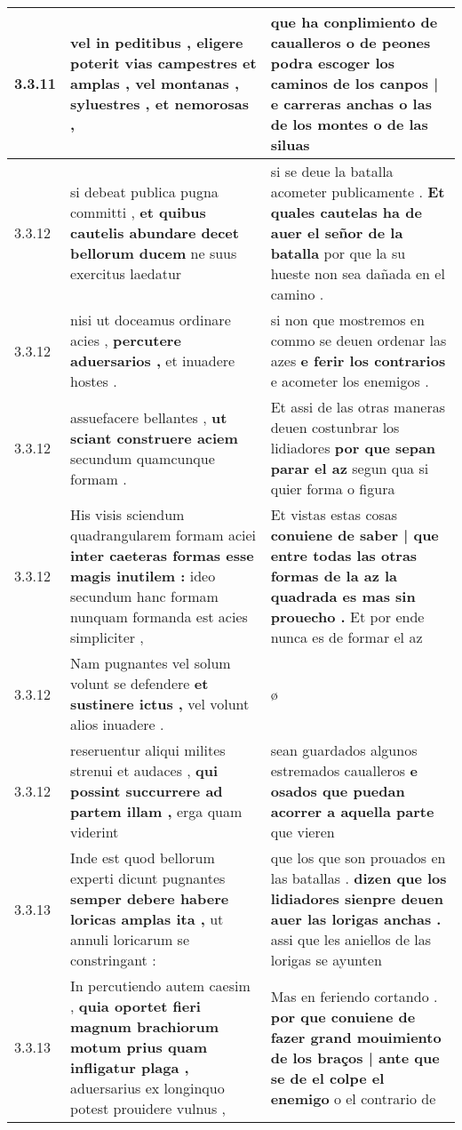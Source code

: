 \begin{tabular}{|p{1cm}|p{6.5cm}|p{6.5cm}|}
3.3.11 & vel in peditibus , \textbf{ eligere poterit vias campestres et amplas , } vel montanas , syluestres , et nemorosas , & que ha conplimiento de caualleros o de peones \textbf{ podra escoger los caminos de los canpos | e carreras anchas o las de los montes } o de las siluas \\\hline
3.3.12 & si debeat publica pugna committi , \textbf{ et quibus cautelis abundare decet bellorum ducem } ne suus exercitus laedatur & si se deue la batalla acometer publicamente . \textbf{ Et quales cautelas ha de auer el señor de la batalla } por que la su hueste non sea dañada en el camino . \\\hline
3.3.12 & nisi ut doceamus ordinare acies , \textbf{ percutere aduersarios , } et inuadere hostes . & si non que mostremos en commo se deuen ordenar las azes \textbf{ e ferir los contrarios } e acometer los enemigos . \\\hline
3.3.12 & assuefacere bellantes , \textbf{ ut sciant construere aciem } secundum quamcunque formam . & Et assi de las otras maneras deuen costunbrar los lidiadores \textbf{ por que sepan parar el az } segun qua si quier forma o figura \\\hline
3.3.12 & His visis sciendum quadrangularem formam aciei \textbf{ inter caeteras formas esse magis inutilem : } ideo secundum hanc formam nunquam formanda est acies simpliciter , & Et vistas estas cosas \textbf{ conuiene de saber | que entre todas las otras formas de la az la quadrada es mas sin prouecho . } Et por ende nunca es de formar el az \\\hline
3.3.12 & Nam pugnantes vel solum volunt se defendere \textbf{ et sustinere ictus , } vel volunt alios inuadere . & ø \\\hline
3.3.12 & reseruentur aliqui milites strenui et audaces , \textbf{ qui possint succurrere ad partem illam , } erga quam viderint & sean guardados algunos estremados caualleros \textbf{ e osados que puedan acorrer a aquella parte } que vieren \\\hline
3.3.13 & Inde est quod bellorum experti dicunt pugnantes \textbf{ semper debere habere loricas amplas ita , } ut annuli loricarum se constringant : & que los que son prouados en las batallas . \textbf{ dizen que los lidiadores sienpre deuen auer las lorigas anchas . } assi que les aniellos de las lorigas se ayunten \\\hline
3.3.13 & In percutiendo autem caesim , \textbf{ quia oportet fieri magnum brachiorum motum prius quam infligatur plaga , } aduersarius ex longinquo potest prouidere vulnus , & Mas en feriendo cortando . \textbf{ por que conuiene de fazer grand mouimiento de los braços | ante que se de el colpe el enemigo } o el contrario de \\\hline

\end{tabular}
